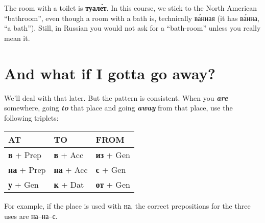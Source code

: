 The room with a toilet is \textbf{туал\'{е}т}. In this course, we stick to
the North American ``bathroom'', even though a room with a bath is,
technically в\'{а}нная (it has в\'{а}нна, ``a bath''). Still, in Russian you
would not ask for a ``bath-room'' unless you really mean it.

\section{\texorpdfstring{And what if I gotta go
\textbf{away}?}{And what if I gotta go away?}}\label{and-what-if-i-gotta-go-away}

We'll deal with that later. But the pattern is consistent. When you
\textbf{\emph{are}} somewhere, going \textbf{\emph{to}} that place and
going \textbf{\emph{away}} from that place, use the following triplets:

\begin{longtable}[]{@{}lll@{}}
\toprule
AT & TO & FROM\tabularnewline
\midrule
\endhead
\textbf{в} + Prep & \textbf{в} + Acc & \textbf{из} + Gen\tabularnewline
\textbf{на} + Prep & \textbf{на} + Acc & \textbf{с} + Gen\tabularnewline
\textbf{у} + Gen & \textbf{к} + Dat & \textbf{от} + Gen\tabularnewline
\bottomrule
\end{longtable}

For example, if the place is used with на, the correct prepositions for
the three uses are на--на--с.
